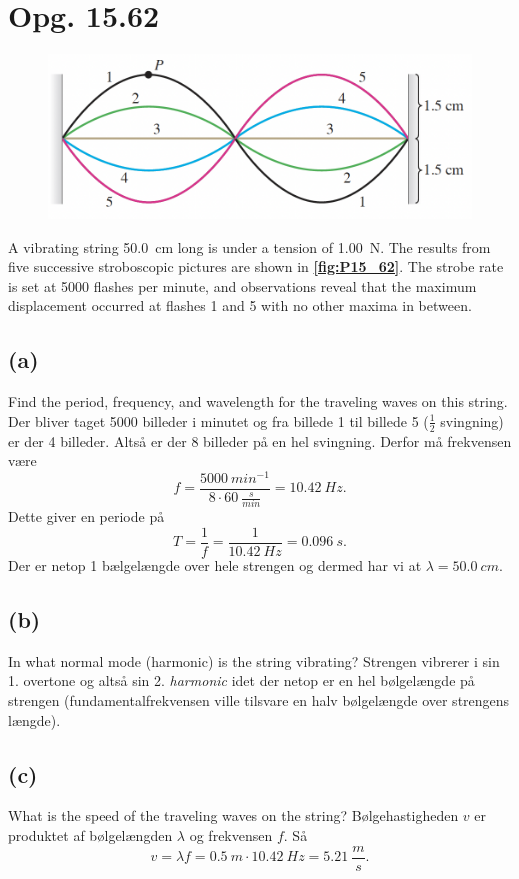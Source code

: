 \documentclass[12pt]{article}
\theoremstyle{definition}
\begin{document}
\section*{Opg. 15.62}
\begin{figure} [ht]
  \centering
  \caption{}
  \includegraphics[width=0.5\linewidth]{../figures/P15_62.png}
  \label{fig:P15_62}
\end{figure}
A vibrating string \qty{50,0}{cm} long is under a tension of \qty{1,00}{N}. The results from five successive stroboscopic pictures are shown in \textbf{\autoref{fig:P15_62}}. The strobe rate is set at 5000 flashes per minute, and observations reveal that the maximum displacement occurred at flashes 1 and 5 with no other maxima in between.

\subsection*{(a)}
Find the period, frequency, and wavelength for the traveling waves on this string.
\bigbreak
Der bliver taget 5000 billeder i minutet og fra billede 1 til billede 5 ($\frac{1}{2}$ svingning) er der 4 billeder. Altså er der 8 billeder på en hel svingning. Derfor må frekvensen være
\[ 
f = \frac{\qty{5000}{min^{-1}}}{8\cdot \qty{60}{\frac{s}{min}} } = \qty{10,42}{Hz}  
.\]
Dette giver en periode på
\[ 
T = \frac{1}{f} = \frac{1}{\qty{10,42}{Hz}} = \qty{0,096}{s} 
.\]
Der er netop 1 bælgelængde over hele strengen og dermed har vi at $\lambda = \qty{50,0}{cm}$.


\subsection*{(b)}
In what normal mode (harmonic) is the string vibrating?
\bigbreak
Strengen vibrerer i sin 1. overtone og altså sin 2. \textit{harmonic} idet der netop er en hel bøl\-ge\-læng\-de på strengen (fundamentalfrekvensen ville tilsvare en halv bølgelængde over strengens længde).


\subsection*{(c)}
What is the speed of the traveling waves on the string?
\bigbreak
Bølgehastigheden $v$ er produktet af bølgelængden $\lambda$ og frekvensen $f$. Så
\[ 
v = \lambda f = \qty{0,5}{m} \cdot \qty{10,42}{Hz} = \qty{5,21}{\frac{m}{s}}  
.\]
\end{document}
